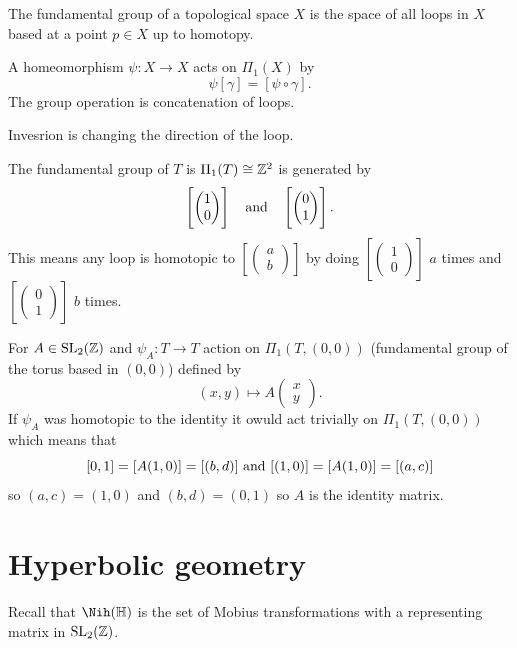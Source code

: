 \documentclass[11pt,a4paper]{article}
\renewcommand{\H}{\mathbb H}
\DeclareMathOperator{\SL}{SL}
\begin{document}
\begin{definition}
  The fundamental group of a topological space $X$ is the space of all loops
  in $X$ based at a point $p \in X$ up to homotopy.
\end{definition}
 
A homeomorphism $\psi \colon X \to X$ acts on $\Pi_1(X)$ by
\[
  \psi[\gamma] = [\psi \circ \gamma].
\]
The group operation is concatenation of loops.

Invesrion is changing the direction of the loop.

\begin{exercise}
  The fundamental group of $T$ is $\Pi_1(T) \cong \mathbb{Z}^2$ is generated
  by \[\left[\begin{pmatrix} 1 \\ 0 \end{pmatrix}\right] \quad \text{and} \quad
  \left[\begin{pmatrix} 0 \\ 1 \end{pmatrix}\right].\]
  This means any loop is homotopic to
  $[\begin{pmatrix} a \\ b \end{pmatrix}]$
  by doing $[\begin{pmatrix} 1 \\ 0 \end{pmatrix}]$ $a$ times
  and $[\begin{pmatrix} 0 \\ 1 \end{pmatrix}]$ $b$ times.
\end{exercise}

For $A \in \SL_2(\Z)$ and $\psi_A \colon T \to T$ action on
$\Pi_1(T, (0,0))$ (fundamental group of the torus based in $(0,0)$)
defined by
\[
  (x,y) \mapsto A \begin{pmatrix} x \\ y \end{pmatrix}.
\]
If $\psi_A$ was homotopic to the identity it owuld act trivially on
$\Pi_1(T, (0,0))$ which means that
\[
  [0,1] = [A (1,0)] = [(b,d)] \text{ and } [(1,0)] = [A(1,0)] = [(a,c)]
\]
so $(a,c) = (1,0)$ and $(b,d) = (0,1)$ so $A$ is the identity matrix.

\newpage

\section{Hyperbolic geometry}
Recall that $\Nih(\H)$ is the set of Mobius transformations with a representing
matrix in $\SL_2(\Z)$.
\end{document}
